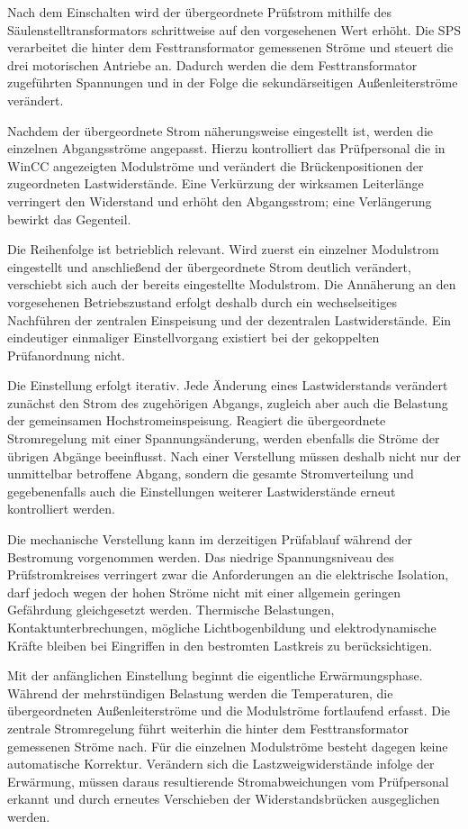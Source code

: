 Nach dem Einschalten wird der übergeordnete Prüfstrom mithilfe des
Säulenstelltransformators schrittweise auf den vorgesehenen Wert erhöht. Die
SPS verarbeitet die hinter dem Festtransformator gemessenen Ströme und
steuert die drei motorischen Antriebe an. Dadurch werden die dem
Festtransformator zugeführten Spannungen und in der Folge die
sekundärseitigen Außenleiterströme verändert.

Nachdem der übergeordnete Strom näherungsweise eingestellt ist, werden die
einzelnen Abgangsströme angepasst. Hierzu kontrolliert das Prüfpersonal die
in WinCC angezeigten Modulströme und verändert die Brückenpositionen der
zugeordneten Lastwiderstände. Eine Verkürzung der wirksamen Leiterlänge
verringert den Widerstand und erhöht den Abgangsstrom; eine Verlängerung
bewirkt das Gegenteil.

Die Reihenfolge ist betrieblich relevant. Wird zuerst ein einzelner
Modulstrom eingestellt und anschließend der übergeordnete Strom deutlich
verändert, verschiebt sich auch der bereits eingestellte Modulstrom. Die
Annäherung an den vorgesehenen Betriebszustand erfolgt deshalb durch ein
wechselseitiges Nachführen der zentralen Einspeisung und der dezentralen
Lastwiderstände. Ein eindeutiger einmaliger Einstellvorgang existiert bei der
gekoppelten Prüfanordnung nicht.

Die Einstellung erfolgt iterativ. Jede Änderung eines Lastwiderstands
verändert zunächst den Strom des zugehörigen Abgangs, zugleich aber auch die
Belastung der gemeinsamen Hochstromeinspeisung. Reagiert die übergeordnete
Stromregelung mit einer Spannungsänderung, werden ebenfalls die Ströme der
übrigen Abgänge beeinflusst. Nach einer Verstellung müssen deshalb nicht nur
der unmittelbar betroffene Abgang, sondern die gesamte Stromverteilung und
gegebenenfalls auch die Einstellungen weiterer Lastwiderstände erneut
kontrolliert werden.

Die mechanische Verstellung kann im derzeitigen Prüfablauf während der
Bestromung vorgenommen werden. Das niedrige Spannungsniveau des
Prüfstromkreises verringert zwar die Anforderungen an die elektrische
Isolation, darf jedoch wegen der hohen Ströme nicht mit einer allgemein
geringen Gefährdung gleichgesetzt werden. Thermische Belastungen,
Kontaktunterbrechungen, mögliche Lichtbogenbildung und elektrodynamische
Kräfte bleiben bei Eingriffen in den bestromten Lastkreis zu
berücksichtigen.

Mit der anfänglichen Einstellung beginnt die eigentliche Erwärmungsphase.
Während der mehrstündigen Belastung werden die Temperaturen, die
übergeordneten Außenleiterströme und die Modulströme fortlaufend erfasst. Die
zentrale Stromregelung führt weiterhin die hinter dem Festtransformator
gemessenen Ströme nach. Für die einzelnen Modulströme besteht dagegen keine
automatische Korrektur. Verändern sich die Lastzweigwiderstände infolge der
Erwärmung, müssen daraus resultierende Stromabweichungen vom Prüfpersonal
erkannt und durch erneutes Verschieben der Widerstandsbrücken ausgeglichen
werden.

